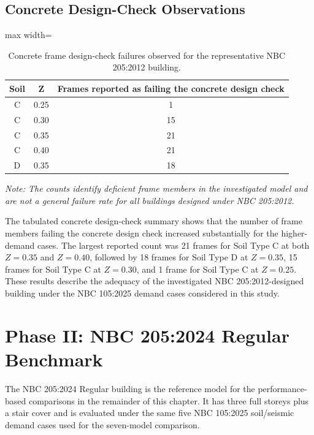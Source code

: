 \subsection{Concrete Design-Check Observations}
\begin{table}[!htbp]
\caption[Concrete design-check failures for the 2012 reference]{Concrete frame design-check failures observed for the representative NBC 205:2012 building.}
\label{tab:ch4_2012_failures}
\centering
\begin{adjustbox}{max width=\linewidth}
\begin{tabular}{@{}ccc@{}}
\toprule
\textbf{Soil} & \textbf{Z} & \textbf{Frames reported as failing the concrete design check}\\
\midrule
C & 0.25 & 1\\
C & 0.30 & 15\\
C & 0.35 & 21\\
C & 0.40 & 21\\
D & 0.35 & 18\\
\bottomrule
\end{tabular}
\end{adjustbox}

\vspace{0.5ex}\par\noindent\normalfont\normalsize\onehalfspacing\justifying\textit{Note: The counts identify deficient frame members in the investigated model and are not a general failure rate for all buildings designed under NBC 205:2012.}
\end{table}

The tabulated concrete design-\allowbreak{}check summary shows that the number of frame members failing the concrete design check increased substantially for the higher-demand cases. The largest reported count was 21 frames for Soil Type C at both $Z=0.35$ and $Z=0.40$, followed by 18 frames for Soil Type D at $Z=0.35$, 15 frames for Soil Type C at $Z=0.30$, and 1 frame for Soil Type C at $Z=0.25$. These results describe the adequacy of the investigated NBC 205:2012-designed building under the NBC 105:2025 demand cases considered in this study.

\section{Phase II: NBC 205:2024 Regular Benchmark}
The NBC 205:2024 Regular building is the reference model for the performance-based comparisons in the remainder of this chapter. It has three full storeys plus a stair cover and is evaluated under the same five NBC 105:2025 soil/seismic demand cases used for the seven-model comparison.

